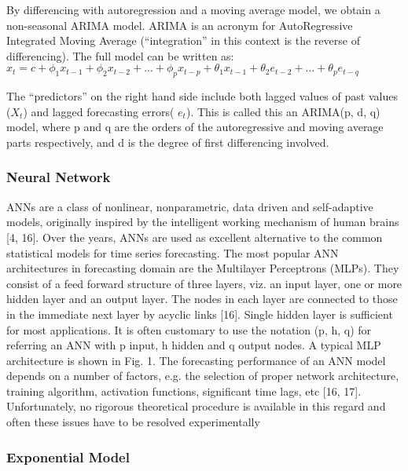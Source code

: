 By  differencing with autoregression and a moving average model, we obtain a non-seasonal ARIMA model. ARIMA is an acronym for AutoRegressive Integrated Moving Average (“integration” in this context is the reverse of differencing). The full model can be written as:
		$x_{t} = c + \phi_{1}x_{t - 1} + \phi_{2}x_{t - 2} + ...+ \phi_{p}x_{t-p}  + \theta _{1}x_{t - 1} + \theta _{2}e_{t - 2} + ...+ \theta_{p}e_{t-q}$
		
The “predictors” on the right hand side include both lagged values of past values ($X_t$) and lagged forecasting errors( $e_t$). This is called this an ARIMA(p, d, q) model, where p and q are the orders of the autoregressive and moving average parts respectively, and d is the degree of first differencing involved.


\subsubsection{Neural Network}

ANNs are a class of nonlinear, nonparametric, data driven and self-adaptive models, originally inspired by the
intelligent working mechanism of human brains [4, 16]. Over the years, ANNs are used as excellent alternative to the common statistical models for time series forecasting. The most popular ANN architectures in forecasting domain are the Multilayer Perceptrons (MLPs). They consist of a feed forward structure of three layers, viz. an input layer, one or more hidden layer and an output layer. The nodes in each layer are connected to those in the immediate next layer by acyclic links [16]. Single hidden layer is sufficient for most applications. It is often customary to use the notation (p, h, q) for referring an ANN with p input, h hidden and q output nodes. A typical MLP architecture is shown in Fig. 1. The forecasting performance of an ANN model depends on a number of factors, e.g. the selection of proper network architecture, training algorithm, activation functions, significant time lags, etc [16, 17]. Unfortunately, no rigorous theoretical procedure is available in this regard and often these issues have to be resolved experimentally

\subsubsection{Exponential Model}




